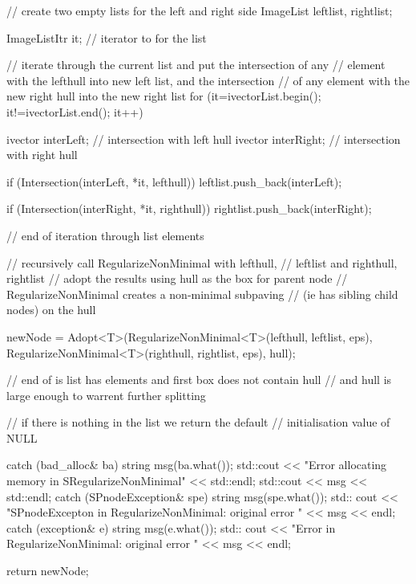 \begin{DoxyCode}
{{{            // create two empty lists for the left and right side
            ImageList leftlist, rightlist;

            ImageListItr it; // iterator to for the list

            // iterate through the current list and put the intersection of any
            // element with the lefthull into new left list, and the
       intersection
            // of any element with the new right hull into the new right list
            for (it=ivectorList.begin(); it!=ivectorList.end(); it++) {
                ivector interLeft;  // intersection with left hull
                ivector interRight;  // intersection with right hull

                if (Intersection(interLeft, *it, lefthull)) {
                    leftlist.push_back(interLeft);
                }

                if (Intersection(interRight, *it, righthull)) {
                    rightlist.push_back(interRight);
                }

            } // end of iteration through list elements

            // recursively call RegularizeNonMinimal with lefthull,
            // leftlist and righthull, rightlist
            // adopt the results using hull as the box for parent node
            // RegularizeNonMinimal creates a non-minimal subpaving
            // (ie has sibling child nodes) on the hull

            newNode = Adopt<T>(RegularizeNonMinimal<T>(lefthull, leftlist,
                                                    eps),
                            RegularizeNonMinimal<T>(righthull,
                                                    rightlist,
                                                    eps),
                                            hull);

        } // end of is list has elements and first box does not contain hull
        // and hull is large enough to warrent further splitting

        // if there is nothing in the list we return the default
            // initialisation value of NULL
    }
    catch (bad_alloc& ba)
    {
        string msg(ba.what());
        std::cout << "Error allocating memory in SRegularizeNonMinimal"
                                            << std::endl;
        std::cout << msg << std::endl;
    }
    catch (SPnodeException& spe) {
        string msg(spe.what());
        std:: cout << "SPnodeExcepton in RegularizeNonMinimal: original error "
                                            << msg << endl;
    }
    catch (exception& e) {
        string msg(e.what());
        std:: cout << "Error in RegularizeNonMinimal: original error "
                                            << msg << endl;
    }

    return newNode;

}
\end{DoxyCode}

